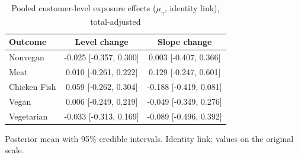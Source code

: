 \begin{table}[H]
\centering
\caption{Pooled customer-level exposure effects ($\mu_\gamma$, identity link), total-adjusted}
\label{tab:a5_mu_gamma_adj}
\begin{tabular}{lcc}
\toprule
Outcome & Level change & Slope change \\
\midrule
Nonvegan & -0.025 [-0.357, 0.300] & 0.003 [-0.407, 0.366] \\
Meat & 0.010 [-0.261, 0.222] & 0.129 [-0.247, 0.601] \\
Chicken Fish & 0.059 [-0.262, 0.304] & -0.188 [-0.419, 0.081] \\
Vegan & 0.006 [-0.249, 0.219] & -0.049 [-0.349, 0.276] \\
Vegetarian & -0.033 [-0.313, 0.169] & -0.089 [-0.496, 0.392] \\
\bottomrule
\end{tabular}
\par\smallskip\footnotesize Posterior mean with 95\% credible intervals. Identity link; values on the original scale.
\end{table}
